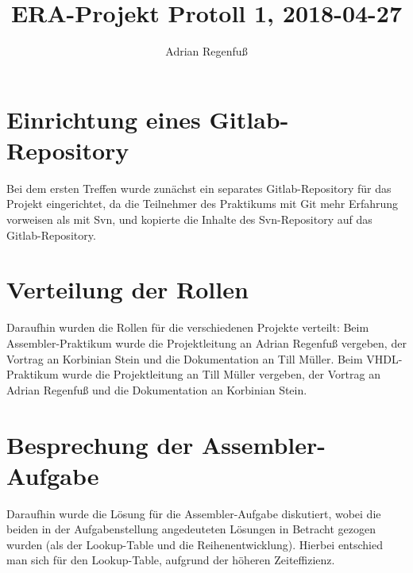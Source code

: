 \documentclass{article}
\title{ERA-Projekt Protoll 1, 2018-04-27}
\author{Adrian Regenfuß}
\begin{document}
\maketitle

\section{Einrichtung eines Gitlab-Repository}

Bei dem ersten Treffen wurde zunächst ein separates Gitlab-Repository
für das Projekt eingerichtet, da die Teilnehmer des Praktikums mit Git
mehr Erfahrung vorweisen als mit Svn, und kopierte die Inhalte des
Svn-Repository auf das Gitlab-Repository.

\section{Verteilung der Rollen}

Daraufhin wurden die Rollen für die verschiedenen Projekte verteilt:
Beim Assembler-Praktikum wurde die Projektleitung an Adrian Regenfuß vergeben,
der Vortrag an Korbinian Stein und die Dokumentation an Till Müller.
Beim VHDL-Praktikum wurde die Projektleitung an Till Müller vergeben,
der Vortrag an Adrian Regenfuß und die Dokumentation an Korbinian Stein.

\section{Besprechung der Assembler-Aufgabe}

Daraufhin wurde die Lösung für die Assembler-Aufgabe diskutiert, wobei
die beiden in der Aufgabenstellung angedeuteten Lösungen in Betracht
gezogen wurden (als der Lookup-Table und die Reihenentwicklung). Hierbei
entschied man sich für den Lookup-Table, aufgrund der höheren Zeiteffizienz.
\end{document}
